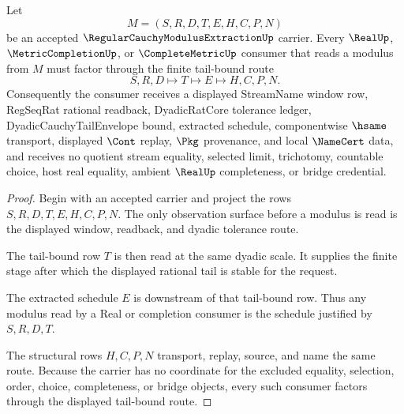 \begin{theorem}
\label{thm:regular-cauchy-modulus-extraction-tail-bound-route}
Let
$$
M=(S,R,D,T,E,H,C,P,N)
$$
be an accepted $\RegularCauchyModulusExtractionUp$ carrier. Every $\RealUp$, $\MetricCompletionUp$, or $\CompleteMetricUp$ consumer that reads a modulus from $M$ must factor through the finite tail-bound route
$$
S,R,D \longmapsto T \longmapsto E \longmapsto H,C,P,N .
$$
Consequently the consumer receives a displayed StreamName window row, RegSeqRat rational readback, DyadicRatCore tolerance ledger, DyadicCauchyTailEnvelope bound, extracted schedule, componentwise $\hsame$ transport, displayed $\Cont$ replay, $\Pkg$ provenance, and local $\NameCert$ data, and receives no quotient stream equality, selected limit, trichotomy, countable choice, host real equality, ambient $\RealUp$ completeness, or bridge credential.
\end{theorem}
\begin{proof}
Begin with an accepted carrier and project the rows $S,R,D,T,E,H,C,P,N$. The only observation surface before a modulus is read is the displayed window, readback, and dyadic tolerance route.

The tail-bound row $T$ is then read at the same dyadic scale. It supplies the finite stage after which the displayed rational tail is stable for the request.

The extracted schedule $E$ is downstream of that tail-bound row. Thus any modulus read by a Real or completion consumer is the schedule justified by $S,R,D,T$.

The structural rows $H,C,P,N$ transport, replay, source, and name the same route. Because the carrier has no coordinate for the excluded equality, selection, order, choice, completeness, or bridge objects, every such consumer factors through the displayed tail-bound route.
\end{proof}


